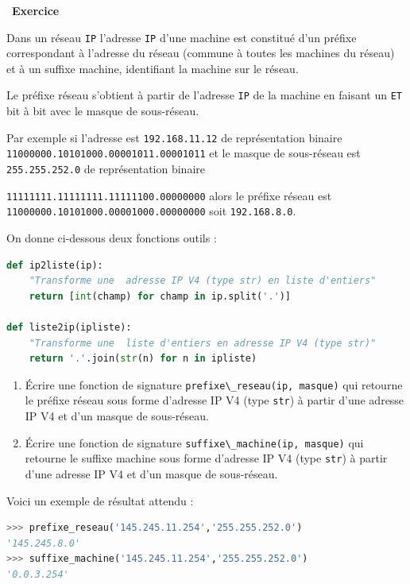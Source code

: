 \documentclass[
  11pt,
]{article}
\newcommand{\passthrough}[1]{#1}
\newcounter{exo}
\newenvironment{exercice}[1]
{\par \medskip   \addtocounter{exo}{1} \noindent  
\begin{bclogo}[arrondi =0.1,   noborder = true, logo=\bccrayon, marge=4]{~\textbf{Exercice} \textbf{\theexo} {\itshape #1} }  \par}
{
\end{bclogo}
 \par \bigskip }
\newcounter{def}
\begin{document}
\begin{exercice}{}

Dans un réseau \passthrough{\lstinline!IP!} l'adresse
\passthrough{\lstinline!IP!} d'une machine est constitué d'un préfixe
correspondant à l'adresse du réseau (commune à toutes les machines du
réseau) et à un suffixe machine, identifiant la machine sur le réseau.

Le préfixe réseau s'obtient à partir de l'adresse
\passthrough{\lstinline!IP!} de la machine en faisant un
\passthrough{\lstinline!ET!} bit à bit avec le masque de sous-réseau.

Par exemple si l'adresse est \passthrough{\lstinline!192.168.11.12!} de
représentation binaire
\passthrough{\lstinline!11000000.10101000.00001011.00001011!} et le
masque de sous-réseau est \passthrough{\lstinline!255.255.252.0!} de
représentation binaire

\passthrough{\lstinline!11111111.11111111.11111100.00000000!} alors le
préfixe réseau est
\passthrough{\lstinline!11000000.10101000.00001000.00000000!} soit
\passthrough{\lstinline!192.168.8.0!}.

On donne ci-dessous deux fonctions outils :

\begin{lstlisting}[language=Python]
def ip2liste(ip):
    "Transforme une  adresse IP V4 (type str) en liste d'entiers"
    return [int(champ) for champ in ip.split('.')]

def liste2ip(ipliste):
    "Transforme une  liste d'entiers en adresse IP V4 (type str)"
    return '.'.join(str(n) for n in ipliste)
\end{lstlisting}

\begin{enumerate}
\def\labelenumi{\arabic{enumi}.}
\item
  Écrire une fonction de signature
  \passthrough{\lstinline!prefixe\_reseau(ip, masque)!} qui retourne le
  préfixe réseau sous forme d'adresse IP V4 (type
  \passthrough{\lstinline!str!}) à partir d'une adresse IP V4 et d'un
  masque de sous-réseau.
\item
  Écrire une fonction de signature
  \passthrough{\lstinline!suffixe\_machine(ip, masque)!} qui retourne le
  suffixe machine sous forme d'adresse IP V4 (type
  \passthrough{\lstinline!str!}) à partir d'une adresse IP V4 et d'un
  masque de sous-réseau.
\end{enumerate}

Voici un exemple de résultat attendu :

\begin{lstlisting}[language=Python]
>>> prefixe_reseau('145.245.11.254','255.255.252.0')
'145.245.8.0'
>>> suffixe_machine('145.245.11.254','255.255.252.0')
'0.0.3.254'
\end{lstlisting}

\end{exercice}
\end{document}

